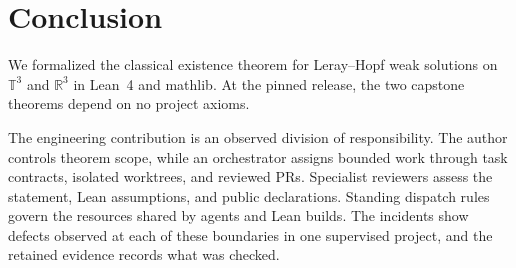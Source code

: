\section{Conclusion}\label{sec:conclusion}

We formalized the classical existence theorem for Leray--Hopf weak
solutions on $\mathbb{T}^3$ and $\mathbb{R}^3$ in Lean~4 and mathlib. At
the pinned release, the two capstone theorems depend on no project axioms.

The engineering contribution is an observed division of responsibility.
The author controls theorem scope, while an orchestrator assigns bounded
work through task contracts, isolated worktrees, and reviewed PRs.
Specialist reviewers assess the statement, Lean assumptions, and public
declarations. Standing dispatch rules govern the resources shared by
agents and Lean builds. The incidents show defects observed at each of
these boundaries in one supervised project, and the retained evidence
records what was checked. %
